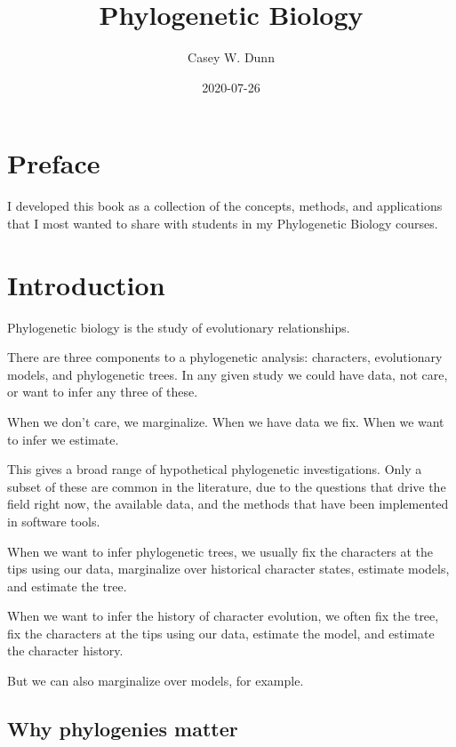 \documentclass[
]{book}
\title{Phylogenetic Biology}
\author{Casey W. Dunn}
\date{2020-07-26}
\begin{document}
\maketitle

{
\setcounter{tocdepth}{1}
\tableofcontents
}
\hypertarget{preface}{%
\chapter*{Preface}\label{preface}}

I developed this book as a collection of the concepts, methods, and applications that I most wanted to share with students in my Phylogenetic Biology courses.

\hypertarget{intro}{%
\chapter{Introduction}\label{intro}}

Phylogenetic biology is the study of evolutionary relationships.

There are three components to a phylogenetic analysis: characters, evolutionary models, and phylogenetic trees. In any given study we could have data, not care, or want to infer any three of these.

When we don't care, we marginalize. When we have data we fix. When we want to infer we estimate.

This gives a broad range of hypothetical phylogenetic investigations. Only a subset of these are common in the literature, due to the questions that drive the field right now, the available data, and the methods that have been implemented in software tools.

When we want to infer phylogenetic trees, we usually fix the characters at the tips using our data, marginalize over historical character states, estimate models, and estimate the tree.

When we want to infer the history of character evolution, we often fix the tree, fix the characters at the tips using our data, estimate the model, and estimate the character history.

But we can also marginalize over models, for example.

\hypertarget{why-phylogenies-matter}{%
\section{Why phylogenies matter}\label{why-phylogenies-matter}}
\end{document}
